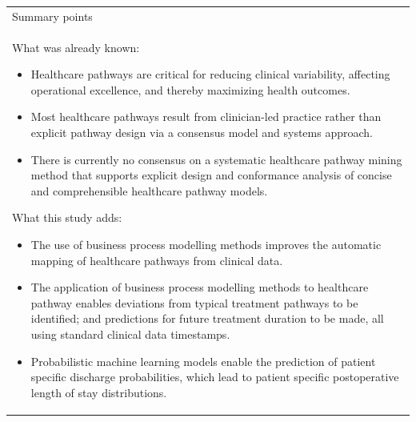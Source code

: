 \begin{table}[h]
\centering
\begin{tabular}{p{11cm}} 
 Summary points\\ 
 What was already known:
 \begin{itemize}
     \item Healthcare pathways are critical for reducing clinical variability, affecting operational excellence, and thereby maximizing health outcomes.
     \item  Most healthcare pathways result from clinician-led practice rather than explicit pathway design via a consensus model and systems approach. 
     \item  There is currently no consensus on a systematic healthcare pathway mining method that supports explicit design and conformance analysis of concise and comprehensible healthcare pathway models.
 \end{itemize}
 What this study adds:
 \begin{itemize}
     \item  The use of business process modelling methods improves the automatic mapping of healthcare pathways from clinical data.
     \item The application of business process modelling methods to
       healthcare pathway enables deviations from typical treatment
       pathways to be identified; and predictions for future treatment
       duration to be made, all using standard clinical data
       timestamps.
     \item Probabilistic machine learning models enable the prediction
       of patient specific discharge probabilities, which lead to
       patient specific postoperative
       length of stay distributions.
 \end{itemize}
\end{tabular}
\end{table}
